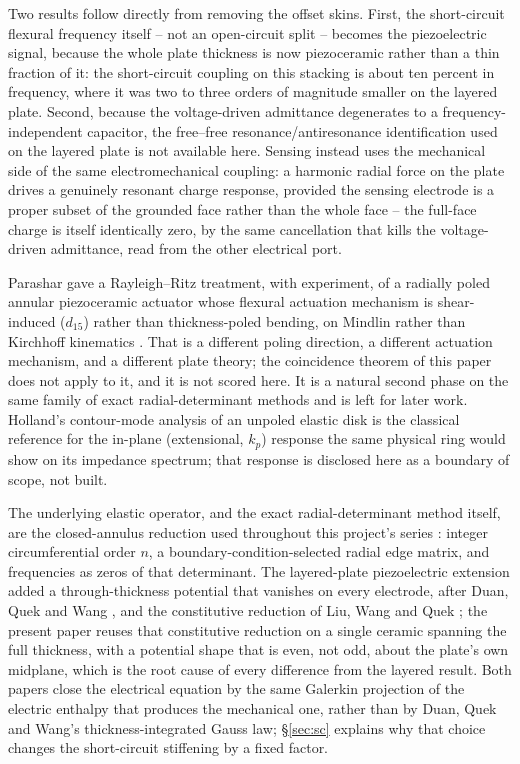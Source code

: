 \documentclass[11pt]{article}
\begin{document}
Two results follow directly from removing the offset skins. First, the
short-circuit flexural frequency itself -- not an open-circuit split --
becomes the piezoelectric signal, because the whole plate thickness is
now piezoceramic rather than a thin fraction of it: the short-circuit
coupling on this stacking is about ten percent in frequency, where it was
two to three orders of magnitude smaller on the layered plate. Second,
because the voltage-driven admittance degenerates to a frequency-%
independent capacitor, the free--free resonance/antiresonance
identification used on the layered plate is not available here. Sensing
instead uses the mechanical side of the same electromechanical coupling:
a harmonic radial force on the plate drives a genuinely resonant charge
response, provided the sensing electrode is a proper subset of the
grounded face rather than the whole face -- the full-face charge is
itself identically zero, by the same cancellation that kills the
voltage-driven admittance, read from the other electrical port.

Parashar gave a Rayleigh--Ritz treatment, with experiment, of a
radially poled annular piezoceramic actuator whose flexural actuation
mechanism is shear-induced ($d_{15}$) rather than thickness-poled
bending, on Mindlin rather than Kirchhoff kinematics \cite{parashar2013}.
That is a different poling direction, a different actuation mechanism,
and a different plate theory; the coincidence theorem of this paper does
not apply to it, and it is not scored here. It is a natural second phase
on the same family of exact radial-determinant methods and is left for
later work. Holland's contour-mode analysis of an unpoled elastic disk
\cite{holland1966} is the classical reference for the in-plane
(extensional, $k_p$) response the same physical ring would show on its
impedance spectrum; that response is disclosed here as a boundary of
scope, not built.

The underlying elastic operator, and the exact radial-determinant method
itself, are the closed-annulus reduction used throughout this project's
series \cite{mccune2026ring}: integer circumferential order $n$, a
boundary-condition-selected radial edge matrix, and frequencies as zeros
of that determinant. The layered-plate piezoelectric extension
\cite{mccune2026piezo} added a through-thickness potential that vanishes
on every electrode, after Duan, Quek and Wang \cite{duan2005}, and the
constitutive reduction of Liu, Wang and Quek \cite{liu2002}; the present
paper reuses that constitutive reduction on a single ceramic spanning the
full thickness, with a potential shape that is even, not odd, about the
plate's own midplane, which is the root cause of every difference from
the layered result. Both papers close the electrical equation by the
same Galerkin projection of the electric enthalpy that produces the
mechanical one, rather than by Duan, Quek and Wang's thickness-integrated
Gauss law; \S\ref{sec:sc} explains why that choice changes the
short-circuit stiffening by a fixed factor.
\end{document}
